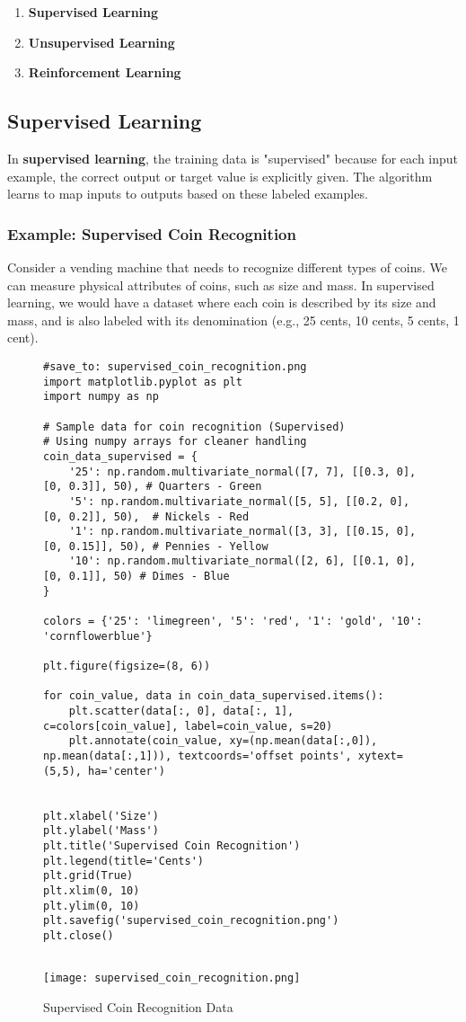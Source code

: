 \documentclass{article}
\begin{document}
\begin{enumerate}
    \item \textbf{Supervised Learning}
    \item \textbf{Unsupervised Learning}
    \item \textbf{Reinforcement Learning}
\end{enumerate}

\subsection{Supervised Learning}
In \textbf{supervised learning}, the training data is "supervised" because for each input example, the correct output or target value is explicitly given.  The algorithm learns to map inputs to outputs based on these labeled examples.

\subsubsection{Example: Supervised Coin Recognition}
Consider a vending machine that needs to recognize different types of coins.  We can measure physical attributes of coins, such as size and mass. In supervised learning, we would have a dataset where each coin is described by its size and mass, and is also labeled with its denomination (e.g., 25 cents, 10 cents, 5 cents, 1 cent).

\begin{figure}[H]
    \centering
    \begin{verbatim}
#save_to: supervised_coin_recognition.png
import matplotlib.pyplot as plt
import numpy as np

# Sample data for coin recognition (Supervised)
# Using numpy arrays for cleaner handling
coin_data_supervised = {
    '25': np.random.multivariate_normal([7, 7], [[0.3, 0], [0, 0.3]], 50), # Quarters - Green
    '5': np.random.multivariate_normal([5, 5], [[0.2, 0], [0, 0.2]], 50),  # Nickels - Red
    '1': np.random.multivariate_normal([3, 3], [[0.15, 0], [0, 0.15]], 50), # Pennies - Yellow
    '10': np.random.multivariate_normal([2, 6], [[0.1, 0], [0, 0.1]], 50) # Dimes - Blue
}

colors = {'25': 'limegreen', '5': 'red', '1': 'gold', '10': 'cornflowerblue'}

plt.figure(figsize=(8, 6))

for coin_value, data in coin_data_supervised.items():
    plt.scatter(data[:, 0], data[:, 1], c=colors[coin_value], label=coin_value, s=20)
    plt.annotate(coin_value, xy=(np.mean(data[:,0]), np.mean(data[:,1])), textcoords='offset points', xytext=(5,5), ha='center')


plt.xlabel('Size')
plt.ylabel('Mass')
plt.title('Supervised Coin Recognition')
plt.legend(title='Cents')
plt.grid(True)
plt.xlim(0, 10)
plt.ylim(0, 10)
plt.savefig('supervised_coin_recognition.png')
plt.close()


    \end{verbatim}
    \texttt{[image: supervised\_coin\_recognition.png]}
    \caption{Supervised Coin Recognition Data}
    \label{fig:supervised_coin_recognition}
\end{figure}
\end{document}
